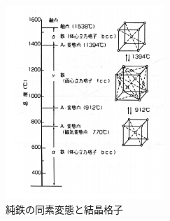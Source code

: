\documentclass[a4paper,11pt,uplatex]{jsarticle}
\begin{document}
\begin{figure}[H]
  \begin{center}
    \includegraphics[width = 6cm]{画像/純鉄の同素変態.png}
    \caption{純鉄の同素変態と結晶格子}
    \label{純鉄の同素変態}
  \end{center}
\end{figure}
\end{document}
